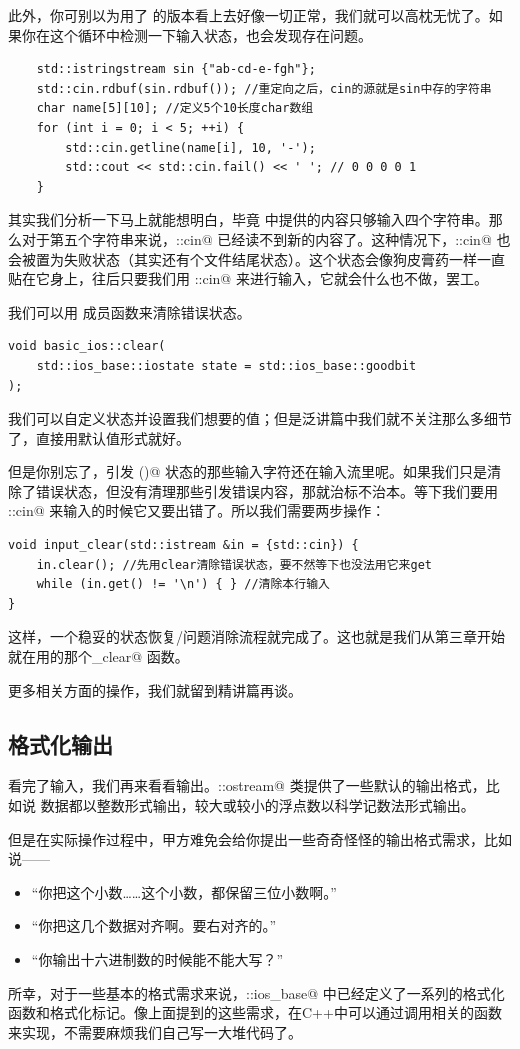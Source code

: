 此外，你可别以为用了 \lstinline@getline@ 的版本看上去好像一切正常，我们就可以高枕无忧了。如果你在这个循环中检测一下输入状态，也会发现存在问题。\pagebreak
\begin{lstlisting}
    std::istringstream sin {"ab-cd-e-fgh"};
    std::cin.rdbuf(sin.rdbuf()); //重定向之后，cin的源就是sin中存的字符串
    char name[5][10]; //定义5个10长度char数组
    for (int i = 0; i < 5; ++i) {
        std::cin.getline(name[i], 10, '-');
        std::cout << std::cin.fail() << ' '; // 0 0 0 0 1
    }
\end{lstlisting}
其实我们分析一下马上就能想明白，毕竟 \lstinline@sin@ 中提供的内容只够输入四个字符串。那么对于第五个字符串来说，\lstinline@std::cin@ 已经读不到新的内容了。这种情况下，\lstinline@std::cin@ 也会被置为失败状态（其实还有个文件结尾状态）。这个状态会像狗皮膏药一样一直贴在它身上，往后只要我们用 \lstinline@std::cin@ 来进行输入，它就会什么也不做，罢工。\par
我们可以用 \lstinline@clear@ 成员函数来清除错误状态。
\begin{lstlisting}
void basic_ios::clear(
    std::ios_base::iostate state = std::ios_base::goodbit
);
\end{lstlisting}
我们可以自定义状态并设置我们想要的值；但是泛讲篇中我们就不关注那么多细节了，直接用默认值形式就好。\par
但是你别忘了，引发 \lstinline@fail()@ 状态的那些输入字符还在输入流里呢。如果我们只是清除了错误状态，但没有清理那些引发错误内容，那就治标不治本。等下我们要用 \lstinline@std::cin@ 来输入的时候它又要出错了。所以我们需要两步操作：
\begin{lstlisting}
void input_clear(std::istream &in = {std::cin}) {
    in.clear(); //先用clear清除错误状态，要不然等下也没法用它来get
    while (in.get() != '\n') { } //清除本行输入
}
\end{lstlisting}
这样，一个稳妥的状态恢复/问题消除流程就完成了。这也就是我们从第三章开始就在用的那个\linebreak\lstinline@input_clear@ 函数。\par
更多相关方面的操作，我们就留到精讲篇再谈。\par
\subsection*{格式化输出}
看完了输入，我们再来看看输出。\lstinline@std::ostream@ 类提供了一些默认的输出格式，比如说 \lstinline@bool@ 数据都以整数形式输出，较大或较小的浮点数以科学记数法形式输出。\par
但是在实际操作过程中，甲方难免会给你提出一些奇奇怪怪的输出格式需求，比如说——
\begin{itemize}
    \item ``你把这个小数……这个小数，都保留三位小数啊。''
    \item ``你把这几个数据对齐啊。要右对齐的。''
    \item ``你输出十六进制数的时候能不能大写？''
\end{itemize}
所幸，对于一些基本的格式需求来说，\lstinline@std::ios_base@ 中已经定义了一系列的格式化函数和格式化标记。像上面提到的这些需求，在C++中可以通过调用相关的函数来实现，不需要麻烦我们自己写一大堆代码了。\par
